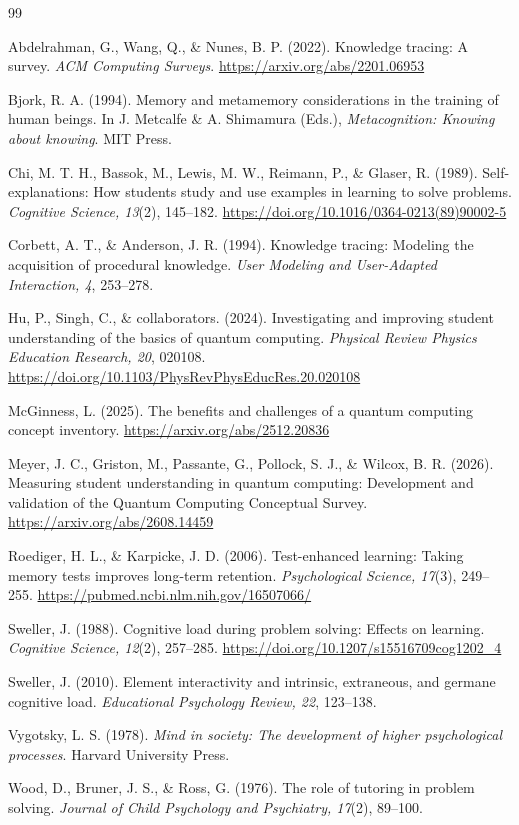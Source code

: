 \documentclass[11pt]{article}
\begin{document}
\begin{thebibliography}{99}

Abdelrahman, G., Wang, Q., \& Nunes, B. P. (2022).
Knowledge tracing: A survey.
\emph{ACM Computing Surveys}.
\url{https://arxiv.org/abs/2201.06953}

Bjork, R. A. (1994).
Memory and metamemory considerations in the training of human beings.
In J. Metcalfe \& A. Shimamura (Eds.), \emph{Metacognition: Knowing about knowing}.
MIT Press.

Chi, M. T. H., Bassok, M., Lewis, M. W., Reimann, P., \& Glaser, R. (1989).
Self-explanations: How students study and use examples in learning to solve problems.
\emph{Cognitive Science, 13}(2), 145--182.
\url{https://doi.org/10.1016/0364-0213(89)90002-5}

Corbett, A. T., \& Anderson, J. R. (1994).
Knowledge tracing: Modeling the acquisition of procedural knowledge.
\emph{User Modeling and User-Adapted Interaction, 4}, 253--278.

Hu, P., Singh, C., \& collaborators. (2024).
Investigating and improving student understanding of the basics of quantum computing.
\emph{Physical Review Physics Education Research, 20}, 020108.
\url{https://doi.org/10.1103/PhysRevPhysEducRes.20.020108}

McGinness, L. (2025).
The benefits and challenges of a quantum computing concept inventory.
\url{https://arxiv.org/abs/2512.20836}

Meyer, J. C., Griston, M., Passante, G., Pollock, S. J., \& Wilcox, B. R. (2026).
Measuring student understanding in quantum computing: Development and validation of the Quantum Computing Conceptual Survey.
\url{https://arxiv.org/abs/2608.14459}

Roediger, H. L., \& Karpicke, J. D. (2006).
Test-enhanced learning: Taking memory tests improves long-term retention.
\emph{Psychological Science, 17}(3), 249--255.
\url{https://pubmed.ncbi.nlm.nih.gov/16507066/}

Sweller, J. (1988).
Cognitive load during problem solving: Effects on learning.
\emph{Cognitive Science, 12}(2), 257--285.
\url{https://doi.org/10.1207/s15516709cog1202_4}

Sweller, J. (2010).
Element interactivity and intrinsic, extraneous, and germane cognitive load.
\emph{Educational Psychology Review, 22}, 123--138.

Vygotsky, L. S. (1978).
\emph{Mind in society: The development of higher psychological processes}.
Harvard University Press.

Wood, D., Bruner, J. S., \& Ross, G. (1976).
The role of tutoring in problem solving.
\emph{Journal of Child Psychology and Psychiatry, 17}(2), 89--100.

\end{thebibliography}
\end{document}

